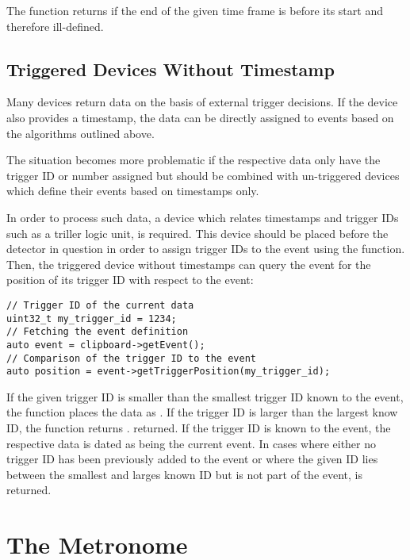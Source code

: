The function returns  if the end of the given time frame is before its start and therefore ill-defined.

\subsection{Triggered Devices Without Timestamp}
\label{sec:triggered_devices}

Many devices return data on the basis of external trigger decisions.
If the device also provides a timestamp, the data can be directly assigned to events based on the algorithms outlined above.

The situation becomes more problematic if the respective data only have the trigger ID or number assigned but should be combined with un-triggered devices which define their events based on timestamps only.


In order to process such data, a device which relates timestamps and trigger IDs such as a triller logic unit, is required.
This device should be placed before the detector in question in order to assign trigger IDs to the event using the  function.
Then, the triggered device without timestamps can query the event for the position of its trigger ID with respect to the event:

\begin{verbatim}
// Trigger ID of the current data
uint32_t my_trigger_id = 1234;
// Fetching the event definition
auto event = clipboard->getEvent();
// Comparison of the trigger ID to the event
auto position = event->getTriggerPosition(my_trigger_id);
\end{verbatim}

If the given trigger ID is smaller than the smallest trigger ID known to the event, the function places the data as .
If the trigger ID is larger than the largest know ID, the function returns . returned. If the trigger ID is known to the event, the respective data is dated as being  the current event.
In cases where either no trigger ID has been previously added to the event or where the given ID lies between the smallest and larges known ID but is not part of the event,  is returned.

\section{The Metronome}
\label{sec:metronome}

